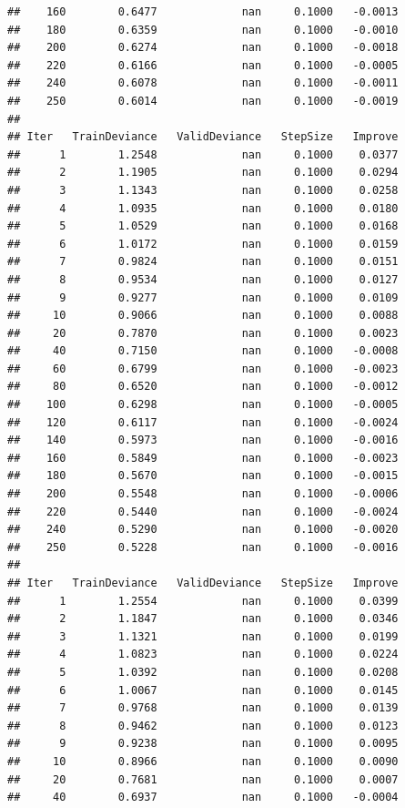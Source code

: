 \documentclass[
]{book}
\begin{document}
\begin{verbatim}
##    160        0.6477             nan     0.1000   -0.0013
##    180        0.6359             nan     0.1000   -0.0010
##    200        0.6274             nan     0.1000   -0.0018
##    220        0.6166             nan     0.1000   -0.0005
##    240        0.6078             nan     0.1000   -0.0011
##    250        0.6014             nan     0.1000   -0.0019
## 
## Iter   TrainDeviance   ValidDeviance   StepSize   Improve
##      1        1.2548             nan     0.1000    0.0377
##      2        1.1905             nan     0.1000    0.0294
##      3        1.1343             nan     0.1000    0.0258
##      4        1.0935             nan     0.1000    0.0180
##      5        1.0529             nan     0.1000    0.0168
##      6        1.0172             nan     0.1000    0.0159
##      7        0.9824             nan     0.1000    0.0151
##      8        0.9534             nan     0.1000    0.0127
##      9        0.9277             nan     0.1000    0.0109
##     10        0.9066             nan     0.1000    0.0088
##     20        0.7870             nan     0.1000    0.0023
##     40        0.7150             nan     0.1000   -0.0008
##     60        0.6799             nan     0.1000   -0.0023
##     80        0.6520             nan     0.1000   -0.0012
##    100        0.6298             nan     0.1000   -0.0005
##    120        0.6117             nan     0.1000   -0.0024
##    140        0.5973             nan     0.1000   -0.0016
##    160        0.5849             nan     0.1000   -0.0023
##    180        0.5670             nan     0.1000   -0.0015
##    200        0.5548             nan     0.1000   -0.0006
##    220        0.5440             nan     0.1000   -0.0024
##    240        0.5290             nan     0.1000   -0.0020
##    250        0.5228             nan     0.1000   -0.0016
## 
## Iter   TrainDeviance   ValidDeviance   StepSize   Improve
##      1        1.2554             nan     0.1000    0.0399
##      2        1.1847             nan     0.1000    0.0346
##      3        1.1321             nan     0.1000    0.0199
##      4        1.0823             nan     0.1000    0.0224
##      5        1.0392             nan     0.1000    0.0208
##      6        1.0067             nan     0.1000    0.0145
##      7        0.9768             nan     0.1000    0.0139
##      8        0.9462             nan     0.1000    0.0123
##      9        0.9238             nan     0.1000    0.0095
##     10        0.8966             nan     0.1000    0.0090
##     20        0.7681             nan     0.1000    0.0007
##     40        0.6937             nan     0.1000   -0.0004

\end{verbatim}
\end{document}
